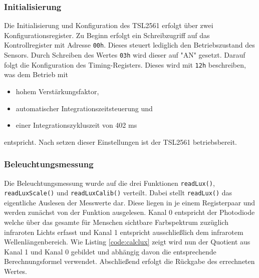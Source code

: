 \documentclass[a4paper,12pt]{scrartcl}
\begin{document}
\subsubsection{Initialisierung}
Die Initialisierung und Konfiguration des TSL2561 erfolgt über zwei Konfigurationsregister. Zu Beginn erfolgt ein Schreibzugriff auf das Kontrollregister mit Adresse \texttt{00h}. Dieses steuert lediglich den Betriebszustand des Sensors. Durch Schreiben des Wertes \texttt{03h} wird dieser auf "AN" gesetzt. Darauf folgt die Konfiguration des Timing-Registers. Dieses wird mit \texttt{12h} beschreiben, was dem Betrieb mit
\begin{itemize}
\item hohem Verstärkungsfaktor,
\item automatischer Integrationszeitsteuerung und 
\item einer Integrationszykluszeit von 402 ms
\end{itemize}
entspricht. Nach setzen dieser Einstellungen ist der TSL2561 betriebsbereit.

\subsubsection{Beleuchtungsmessung}
Die Beleuchtungsmessung wurde auf die drei Funktionen \texttt{readLux()}, \texttt{readLuxScale()} und \texttt{readLuxCalib()} verteilt. Dabei stellt \texttt{readLux()} das eigentliche Auslesen der Messwerte dar. Diese liegen in je einem Registerpaar und werden zunächst von der Funktion ausgelesen. Kanal 0 entspricht der Photodiode welche über das gesamte für Menschen sichtbare Farbspektrum zuzüglich infraroten Lichts erfasst und Kanal 1 entspricht ausschließlich dem infrarotem Wellenlängenbereich. Wie Listing \ref{code:calclux} zeigt wird nun der Quotient aus Kanal 1 und Kanal 0 gebildet und abhängig davon die entsprechende Berechnungsformel verwendet. Abschließend erfolgt die Rückgabe des errechneten Wertes.

\end{document}
